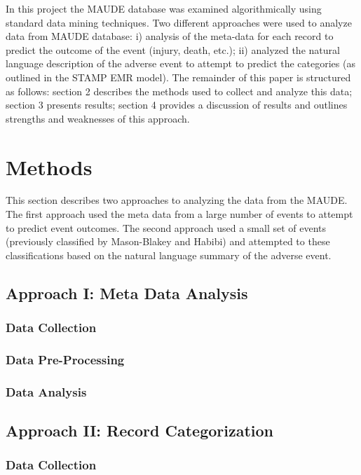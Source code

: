 \documentclass[11pt, notitlepage,abstracton,oneside]{article}   	%
\begin{document}
In this project the MAUDE database was examined algorithmically using standard data mining techniques. Two different approaches were used to analyze data from MAUDE database:  i) analysis of the meta-data for each record to predict the outcome of the event (injury, death, etc.); ii) analyzed the natural language description of the adverse event to attempt to predict the categories (as outlined in the STAMP EMR model). The remainder of this paper is structured as follows: section 2 describes the methods used to collect and analyze this data; section 3 presents results; section 4 provides a discussion of results and outlines strengths and weaknesses of this approach. 

\section{Methods}
This section describes two approaches to analyzing the data from the MAUDE. The first approach used the meta data from a large number of events to attempt to predict event outcomes. The second approach used a small set of events (previously classified by Mason-Blakey and Habibi) and attempted to 	 these classifications based on the natural language summary of the adverse event. 

\subsection{Approach I: Meta Data Analysis}

\subsubsection{Data Collection}

\subsubsection{Data Pre-Processing}

\subsubsection{Data Analysis}

\subsection{Approach II: Record Categorization}
\subsubsection{Data Collection}
\end{document}
